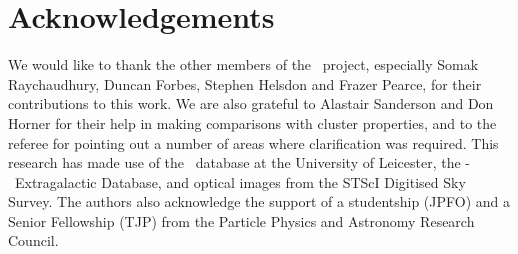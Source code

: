 \documentclass[usenatbib]{mn2e}
\begin{document}

\section{Acknowledgements}

We would like to thank the other members of the \GEMS\ project, especially Somak
Raychaudhury, Duncan Forbes, Stephen Helsdon and Frazer Pearce, for their
contributions to this work. We are also grateful to Alastair Sanderson and Don
Horner for their help in making comparisons with cluster properties, and to
the referee for pointing out a number of areas where clarification
was required. This
research has made use of the \LEDAS\ database at the University of Leicester, the
\NASA-\IPAC\ Extragalactic Database, and optical images from the STScI Digitised
Sky Survey.  The authors also acknowledge the support of a studentship (JPFO) and
a Senior Fellowship (TJP) from the Particle Physics and Astronomy Research
Council.

\end{document}
